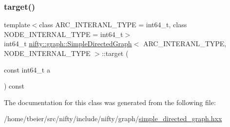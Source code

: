 \mbox{\label{classnifty_1_1graph_1_1SimpleDirectedGraph_a4e637849a581e2f83eed9a2af72f75ad}} 
\subsubsection{\texorpdfstring{target()}{target()}}
{\footnotesize\ttfamily template$<$class A\+R\+C\+\_\+\+I\+N\+T\+E\+R\+A\+N\+L\+\_\+\+T\+Y\+PE  = int64\+\_\+t, class N\+O\+D\+E\+\_\+\+I\+N\+T\+E\+R\+N\+A\+L\+\_\+\+T\+Y\+PE  = int64\+\_\+t$>$ \\
int64\+\_\+t \hyperlink{classnifty_1_1graph_1_1SimpleDirectedGraph}{nifty\+::graph\+::\+Simple\+Directed\+Graph}$<$ A\+R\+C\+\_\+\+I\+N\+T\+E\+R\+A\+N\+L\+\_\+\+T\+Y\+PE, N\+O\+D\+E\+\_\+\+I\+N\+T\+E\+R\+N\+A\+L\+\_\+\+T\+Y\+PE $>$\+::target (\begin{DoxyParamCaption}\item[{const int64\+\_\+t}]{a }\end{DoxyParamCaption}) const\hspace{0.3cm}{\ttfamily [inline]}}



The documentation for this class was generated from the following file\+:\begin{DoxyCompactItemize}
\item 
/home/tbeier/src/nifty/include/nifty/graph/\hyperlink{simple__directed__graph_8hxx}{simple\+\_\+directed\+\_\+graph.\+hxx}\end{DoxyCompactItemize}
